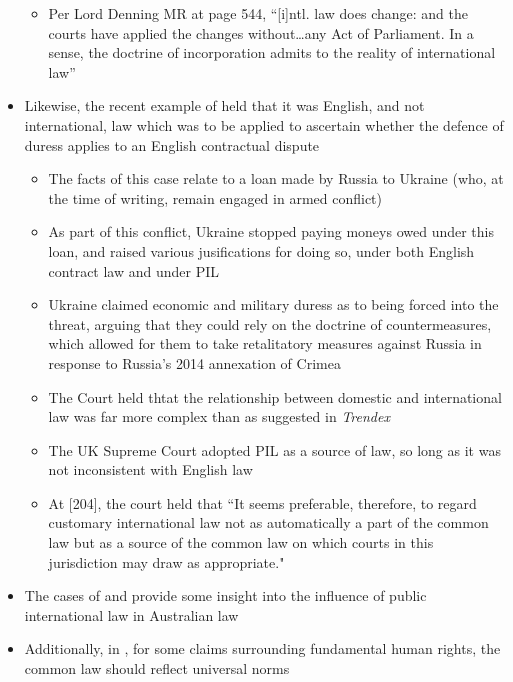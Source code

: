 \begin{itemize}
\begin{itemize}
        \item Per Lord Denning MR at page 544, ``[i]ntl. law does change: and the courts have applied the changes without…any Act of Parliament. In a sense, the doctrine of incorporation admits to the reality of international law''
    \end{itemize}
    \item Likewise, the recent example of  held that it was English, and not international, law which was to be applied to ascertain whether the defence of duress applies to an English contractual dispute
    \begin{itemize}
        \item The facts of this case relate to a loan made by Russia to Ukraine (who, at the time of writing, remain engaged in armed conflict)
        \item As part of this conflict, Ukraine stopped paying moneys owed under this loan, and raised various jusifications for doing so, under both English contract law and under PIL
        \item Ukraine claimed economic and military duress as to being forced into the threat, arguing that they could rely on the doctrine of countermeasures, which allowed for them to take retalitatory measures against Russia in response to Russia's 2014 annexation of Crimea
        \item The Court held thtat the relationship between domestic and international law was far more complex than as suggested in \textit{Trendex}
        \item The UK Supreme Court adopted PIL as a source of law, so long as it was not inconsistent with English law
        \item At [204], the court held that ``It seems preferable, therefore, to regard customary international law not as automatically a part of the common law but as a source of the common law on which courts in this jurisdiction may draw as appropriate."
    \end{itemize}
    \item The cases of  and  provide some insight into the influence of public international law in Australian law
    \item Additionally, in , for some claims surrounding fundamental human rights, the common law should reflect universal norms
\end{itemize}

